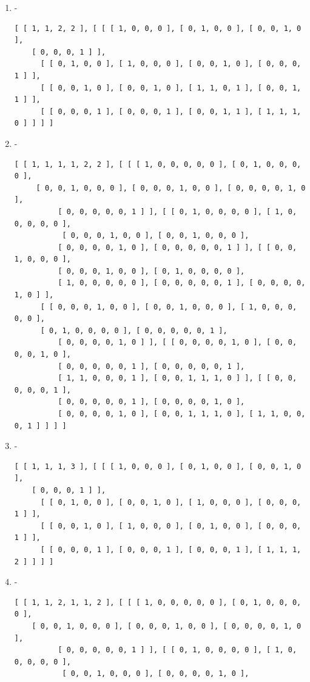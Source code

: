 \documentclass[a4paper, 10pt]{book}
\theoremstyle{definition}
\numberwithin{equation}{chapter}
\begin{document}
\begin{appendices}
\begin{enumerate}
\begin{lstlisting}[numbers=none]
	\end{lstlisting}
	\item -
	 \begin{lstlisting}[numbers=none]
	[ [ 1, 1, 2, 2 ], [ [ [ 1, 0, 0, 0 ], [ 0, 1, 0, 0 ], [ 0, 0, 1, 0 ], 
	[ 0, 0, 0, 1 ] ], 
      [ [ 0, 1, 0, 0 ], [ 1, 0, 0, 0 ], [ 0, 0, 1, 0 ], [ 0, 0, 0, 1 ] ], 
      [ [ 0, 0, 1, 0 ], [ 0, 0, 1, 0 ], [ 1, 1, 0, 1 ], [ 0, 0, 1, 1 ] ], 
      [ [ 0, 0, 0, 1 ], [ 0, 0, 0, 1 ], [ 0, 0, 1, 1 ], [ 1, 1, 1, 0 ] ] ] ]
	\end{lstlisting}
	\item -
	\begin{lstlisting}[numbers=none]
	[ [ 1, 1, 1, 1, 2, 2 ], [ [ [ 1, 0, 0, 0, 0, 0 ], [ 0, 1, 0, 0, 0, 0 ],
	 [ 0, 0, 1, 0, 0, 0 ], [ 0, 0, 0, 1, 0, 0 ], [ 0, 0, 0, 0, 1, 0 ],
          [ 0, 0, 0, 0, 0, 1 ] ], [ [ 0, 1, 0, 0, 0, 0 ], [ 1, 0, 0, 0, 0, 0 ],
           [ 0, 0, 0, 1, 0, 0 ], [ 0, 0, 1, 0, 0, 0 ], 
          [ 0, 0, 0, 0, 1, 0 ], [ 0, 0, 0, 0, 0, 1 ] ], [ [ 0, 0, 1, 0, 0, 0 ], 
          [ 0, 0, 0, 1, 0, 0 ], [ 0, 1, 0, 0, 0, 0 ], 
          [ 1, 0, 0, 0, 0, 0 ], [ 0, 0, 0, 0, 0, 1 ], [ 0, 0, 0, 0, 1, 0 ] ], 
      [ [ 0, 0, 0, 1, 0, 0 ], [ 0, 0, 1, 0, 0, 0 ], [ 1, 0, 0, 0, 0, 0 ], 
      [ 0, 1, 0, 0, 0, 0 ], [ 0, 0, 0, 0, 0, 1 ], 
          [ 0, 0, 0, 0, 1, 0 ] ], [ [ 0, 0, 0, 0, 1, 0 ], [ 0, 0, 0, 0, 1, 0 ], 
          [ 0, 0, 0, 0, 0, 1 ], [ 0, 0, 0, 0, 0, 1 ], 
          [ 1, 1, 0, 0, 0, 1 ], [ 0, 0, 1, 1, 1, 0 ] ], [ [ 0, 0, 0, 0, 0, 1 ], 
          [ 0, 0, 0, 0, 0, 1 ], [ 0, 0, 0, 0, 1, 0 ], 
          [ 0, 0, 0, 0, 1, 0 ], [ 0, 0, 1, 1, 1, 0 ], [ 1, 1, 0, 0, 0, 1 ] ] ] ]
	\end{lstlisting}
	\item -
	\begin{lstlisting}[numbers=none]
	[ [ 1, 1, 1, 3 ], [ [ [ 1, 0, 0, 0 ], [ 0, 1, 0, 0 ], [ 0, 0, 1, 0 ], 
	[ 0, 0, 0, 1 ] ], 
      [ [ 0, 1, 0, 0 ], [ 0, 0, 1, 0 ], [ 1, 0, 0, 0 ], [ 0, 0, 0, 1 ] ], 
      [ [ 0, 0, 1, 0 ], [ 1, 0, 0, 0 ], [ 0, 1, 0, 0 ], [ 0, 0, 0, 1 ] ], 
      [ [ 0, 0, 0, 1 ], [ 0, 0, 0, 1 ], [ 0, 0, 0, 1 ], [ 1, 1, 1, 2 ] ] ] ]
	\end{lstlisting}
	\item -\begin{lstlisting}[numbers=none]
	[ [ 1, 1, 2, 1, 1, 2 ], [ [ [ 1, 0, 0, 0, 0, 0 ], [ 0, 1, 0, 0, 0, 0 ], 
	[ 0, 0, 1, 0, 0, 0 ], [ 0, 0, 0, 1, 0, 0 ], [ 0, 0, 0, 0, 1, 0 ],
          [ 0, 0, 0, 0, 0, 1 ] ], [ [ 0, 1, 0, 0, 0, 0 ], [ 1, 0, 0, 0, 0, 0 ],
           [ 0, 0, 1, 0, 0, 0 ], [ 0, 0, 0, 0, 1, 0 ], 

\end{lstlisting}
\end{enumerate}
\end{appendices}
\end{document}
